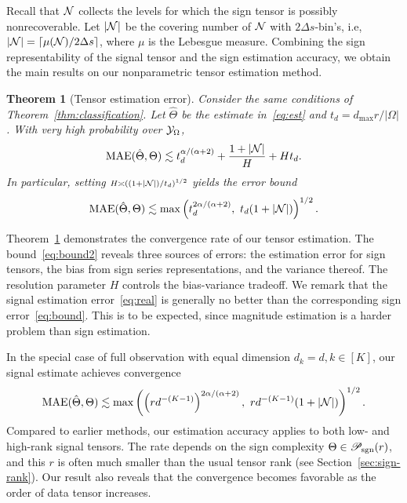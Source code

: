 \documentclass[11pt]{article}
\theoremstyle{plain}
\newtheorem{thm}{Theorem}
\theoremstyle{definition}
\def\caliP{\mathscr{P}_{\textup{sgn}}}
\begin{document}
Recall that $\mathcal{N}$ collects the levels for which the sign tensor is possibly nonrecoverable. Let $|\mathcal{N}|$ be the covering number of $\mathcal{N}$ with $2\Delta s$-bin's, i.e, $|\mathcal{N}| = \lceil \mu(\mathcal{N})/2\Delta s \rceil$, where $\mu$ is the Lebesgue measure. Combining the sign representability of the signal tensor and the sign estimation accuracy, we obtain the main results on our nonparametric tensor estimation method. 


\begin{thm}[Tensor estimation error]\label{thm:estimation} Consider the same conditions of Theorem~\ref{thm:classification}. Let $\hat \Theta$ be the estimate in~\eqref{eq:est} and $t_d={d_{\max}r /|\Omega|}$. With very high probability over $\mathcal{Y}_\Omega$,
\begin{equation}\label{eq:bound2}
\textup{MAE}(\hat \Theta, \Theta)\lesssim t_d^{\alpha/(\alpha+2)}+{1+|\mathcal{N}|\over H}+{Ht_d}.
\end{equation}
In particular, setting $\scriptstyle H\asymp \left( (1+|\mathcal{N}|)/ t_d \right)^{1/2}$ yields the error bound
\begin{equation}\label{eq:real}
\textup{MAE}(\hat \Theta, \Theta)\lesssim \max\left(t_d^{{2\alpha/ (\alpha+2)} },\ t_d(1+|\mathcal{N}|)\right)^{1/2}.
\end{equation}
\end{thm}

Theorem~\ref{thm:estimation} demonstrates the convergence rate of our tensor estimation. The bound~\eqref{eq:bound2} reveals three sources of errors: the estimation error for sign tensors, the bias from sign series representations, and the variance thereof. The resolution parameter $H$ controls the bias-variance tradeoff. We remark that the signal estimation error~\eqref{eq:real} is generally no better than the corresponding sign error~\eqref{eq:bound}. This is to be expected, since magnitude estimation is  a harder problem than sign estimation. 

In the special case of full observation with equal dimension $d_k=d, k\in[K]$, our signal estimate achieves convergence
\begin{equation}
\textup{MAE}(\hat \Theta, \Theta)\lesssim\max\left( \left(rd^{-(K-1)}\right)^{2\alpha /( \alpha+2)},\ rd^{-(K-1)}(1+|\mathcal{N}|)\right)^{1/2}.
\end{equation}
Compared to earlier methods, our estimation accuracy applies to both low- and high-rank signal tensors. The rate depends on the sign complexity $\Theta\in\caliP(r)$, and this $r$ is often much smaller than the usual tensor rank (see Section~\ref{sec:sign-rank}). Our result also reveals that the convergence becomes favorable as the order of data tensor increases. 
\end{document}
